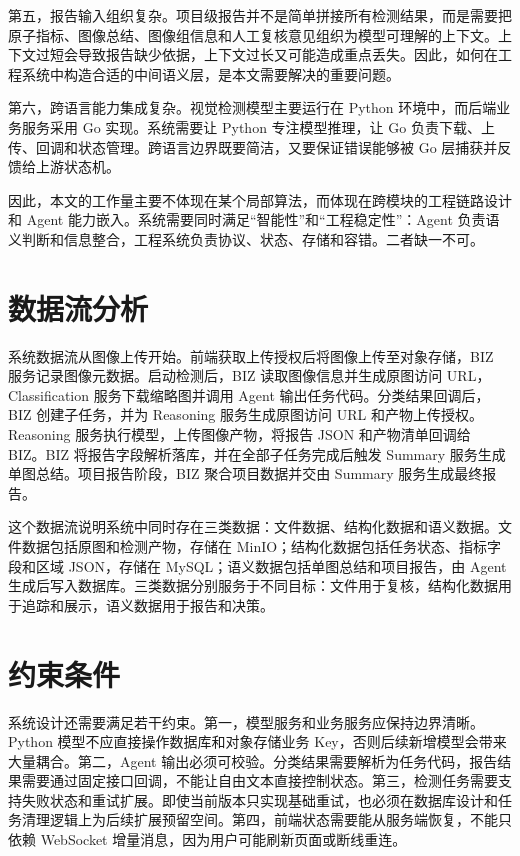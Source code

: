 第五，报告输入组织复杂。项目级报告并不是简单拼接所有检测结果，而是需要把原子指标、图像总结、图像组信息和人工复核意见组织为模型可理解的上下文。上下文过短会导致报告缺少依据，上下文过长又可能造成重点丢失。因此，如何在工程系统中构造合适的中间语义层，是本文需要解决的重要问题。

第六，跨语言能力集成复杂。视觉检测模型主要运行在 Python 环境中，而后端业务服务采用 Go 实现。系统需要让 Python 专注模型推理，让 Go 负责下载、上传、回调和状态管理。跨语言边界既要简洁，又要保证错误能够被 Go 层捕获并反馈给上游状态机。

因此，本文的工作量主要不体现在某个局部算法，而体现在跨模块的工程链路设计和 Agent 能力嵌入。系统需要同时满足“智能性”和“工程稳定性”：Agent 负责语义判断和信息整合，工程系统负责协议、状态、存储和容错。二者缺一不可。

\section{数据流分析}
\label{sec:data-flow-analysis}

系统数据流从图像上传开始。前端获取上传授权后将图像上传至对象存储，BIZ 服务记录图像元数据。启动检测后，BIZ 读取图像信息并生成原图访问 URL，Classification 服务下载缩略图并调用 Agent 输出任务代码。分类结果回调后，BIZ 创建子任务，并为 Reasoning 服务生成原图访问 URL 和产物上传授权。Reasoning 服务执行模型，上传图像产物，将报告 JSON 和产物清单回调给 BIZ。BIZ 将报告字段解析落库，并在全部子任务完成后触发 Summary 服务生成单图总结。项目报告阶段，BIZ 聚合项目数据并交由 Summary 服务生成最终报告。

这个数据流说明系统中同时存在三类数据：文件数据、结构化数据和语义数据。文件数据包括原图和检测产物，存储在 MinIO；结构化数据包括任务状态、指标字段和区域 JSON，存储在 MySQL；语义数据包括单图总结和项目报告，由 Agent 生成后写入数据库。三类数据分别服务于不同目标：文件用于复核，结构化数据用于追踪和展示，语义数据用于报告和决策。

\section{约束条件}
\label{sec:constraints}

系统设计还需要满足若干约束。第一，模型服务和业务服务应保持边界清晰。Python 模型不应直接操作数据库和对象存储业务 Key，否则后续新增模型会带来大量耦合。第二，Agent 输出必须可校验。分类结果需要解析为任务代码，报告结果需要通过固定接口回调，不能让自由文本直接控制状态。第三，检测任务需要支持失败状态和重试扩展。即使当前版本只实现基础重试，也必须在数据库设计和任务清理逻辑上为后续扩展预留空间。第四，前端状态需要能从服务端恢复，不能只依赖 WebSocket 增量消息，因为用户可能刷新页面或断线重连。

